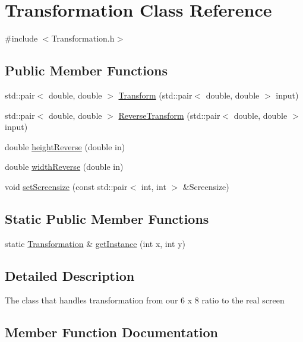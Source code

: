 \hypertarget{classTransformation}{}\section{Transformation Class Reference}
\label{classTransformation}


{\ttfamily \#include $<$Transformation.\+h$>$}

\subsection*{Public Member Functions}
\begin{DoxyCompactItemize}
\item 
std\+::pair$<$ double, double $>$ \hyperlink{classTransformation_a1f4a47d5dd9aaee579613788b7a567bc}{Transform} (std\+::pair$<$ double, double $>$ input)
\item 
std\+::pair$<$ double, double $>$ \hyperlink{classTransformation_a821e71423cd9e8e606ec3487d634f73f}{Reverse\+Transform} (std\+::pair$<$ double, double $>$ input)
\item 
double \hyperlink{classTransformation_a5f95bb2fe7c49c4b1fd73cb27e1e7d07}{height\+Reverse} (double in)
\item 
double \hyperlink{classTransformation_a2b565d1de57cf114dc364b54f3b57fb3}{width\+Reverse} (double in)
\item 
void \hyperlink{classTransformation_a68bd35342726f9920e45cb881457c609}{set\+Screensize} (const std\+::pair$<$ int, int $>$ \&Screensize)
\end{DoxyCompactItemize}
\subsection*{Static Public Member Functions}
\begin{DoxyCompactItemize}
\item 
static \hyperlink{classTransformation}{Transformation} \& \hyperlink{classTransformation_a314c3f2c392a6476e817e6344bc1bee3}{get\+Instance} (int x, int y)
\end{DoxyCompactItemize}


\subsection{Detailed Description}
The class that handles transformation from our 6 x 8 ratio to the real screen 

\subsection{Member Function Documentation}
\mbox{\label{classTransformation_a314c3f2c392a6476e817e6344bc1bee3}} 
